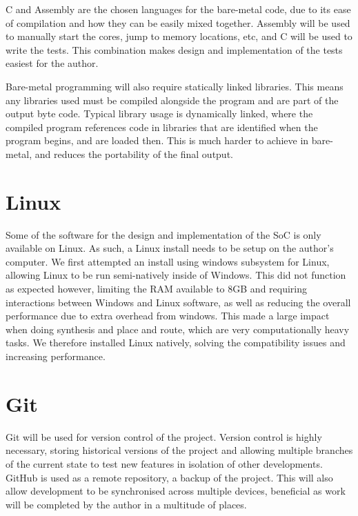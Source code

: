 C and Assembly are the chosen languages for the bare-metal code, due to its ease of compilation and how they can be easily mixed together. Assembly will be used to manually start the cores, jump to memory locations, etc, and C will be used to write the tests. This combination makes design and implementation of the tests easiest for the author.

Bare-metal programming will also require statically linked libraries. This means any libraries used must be compiled alongside the program and are part of the output byte code. Typical library usage is dynamically linked, where the compiled program references code in libraries that are identified when the program begins, and are loaded then. This is much harder to achieve in bare-metal, and reduces the portability of the final output.

\section{Linux}
Some of the software for the design and implementation of the SoC is only available on Linux. As such, a Linux install needs to be setup on the author's computer. We first attempted an install using windows subsystem for Linux, allowing Linux to be run semi-natively inside of Windows. This did not function as expected however, limiting the RAM available to 8GB and requiring interactions between Windows and Linux software, as well as reducing the overall performance due to extra overhead from windows. This made a large impact when doing synthesis and place and route, which are very computationally heavy tasks. We therefore installed Linux natively, solving the compatibility issues and increasing performance.

\section{Git}
Git will be used for version control of the project. Version control is highly necessary, storing historical versions of the project and allowing multiple branches of the current state to test new features in isolation of other developments. GitHub is used as a remote repository, a backup of the project. This will also allow development to be synchronised across multiple devices, beneficial as work will be completed by the author in a multitude of places.